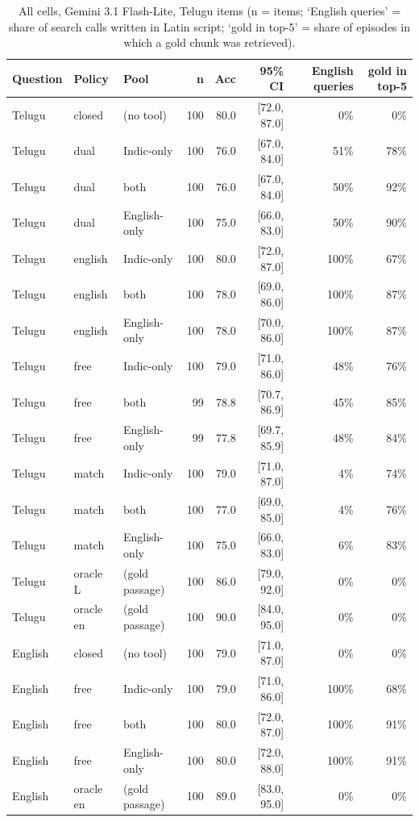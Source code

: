 \begin{table}[h]\centering\scriptsize
\begin{tabular}{lllrrrrr}
\toprule
Question & Policy & Pool & n & Acc & 95\% CI & English queries & gold in top-5 \\
\midrule
Telugu & closed & (no tool) & 100 & 80.0 & [72.0, 87.0] & 0\% & 0\% \\
Telugu & dual & Indic-only & 100 & 76.0 & [67.0, 84.0] & 51\% & 78\% \\
Telugu & dual & both & 100 & 76.0 & [67.0, 84.0] & 50\% & 92\% \\
Telugu & dual & English-only & 100 & 75.0 & [66.0, 83.0] & 50\% & 90\% \\
Telugu & english & Indic-only & 100 & 80.0 & [72.0, 87.0] & 100\% & 67\% \\
Telugu & english & both & 100 & 78.0 & [69.0, 86.0] & 100\% & 87\% \\
Telugu & english & English-only & 100 & 78.0 & [70.0, 86.0] & 100\% & 87\% \\
Telugu & free & Indic-only & 100 & 79.0 & [71.0, 86.0] & 48\% & 76\% \\
Telugu & free & both & 99 & 78.8 & [70.7, 86.9] & 45\% & 85\% \\
Telugu & free & English-only & 99 & 77.8 & [69.7, 85.9] & 48\% & 84\% \\
Telugu & match & Indic-only & 100 & 79.0 & [71.0, 87.0] & 4\% & 74\% \\
Telugu & match & both & 100 & 77.0 & [69.0, 85.0] & 4\% & 76\% \\
Telugu & match & English-only & 100 & 75.0 & [66.0, 83.0] & 6\% & 83\% \\
Telugu & oracle L & (gold passage) & 100 & 86.0 & [79.0, 92.0] & 0\% & 0\% \\
Telugu & oracle en & (gold passage) & 100 & 90.0 & [84.0, 95.0] & 0\% & 0\% \\
English & closed & (no tool) & 100 & 79.0 & [71.0, 87.0] & 0\% & 0\% \\
English & free & Indic-only & 100 & 79.0 & [71.0, 86.0] & 100\% & 68\% \\
English & free & both & 100 & 80.0 & [72.0, 87.0] & 100\% & 91\% \\
English & free & English-only & 100 & 80.0 & [72.0, 88.0] & 100\% & 91\% \\
English & oracle en & (gold passage) & 100 & 89.0 & [83.0, 95.0] & 0\% & 0\% \\
\bottomrule
\end{tabular}
\caption{All cells, Gemini 3.1 Flash-Lite, Telugu items (n = items; `English queries' = share of search calls written in Latin script; `gold in top-5' = share of episodes in which a gold chunk was retrieved).}
\end{table}

